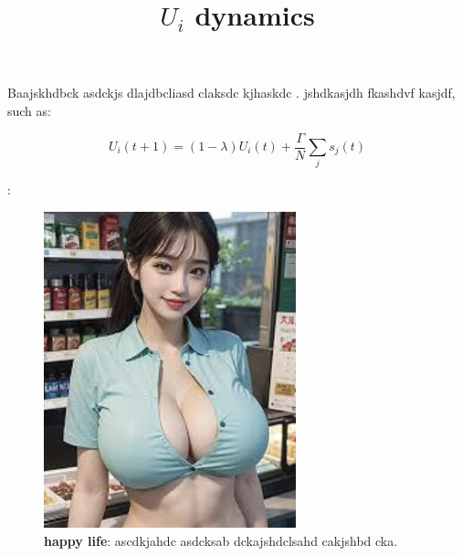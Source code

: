 \documentclass[11pt, letterpaper]{article}
\title{\textbf{$U_i$ dynamics}}
\date{}
\author{
}
\begin{document}
\maketitle

\begin{abstract}
	\lipsum[2]
\end{abstract}

Baajskhdbck asdckjs dlajdbcliasd claksdc kjhaskdc \cite{pereiro-morejonInferenceMetabolicFluxes2022}. 
jshdkasjdh fkashdvf kasjdf, such as:

\begin{equation}
  U_i(t+1) = (1-\lambda)U_i(t) + \frac{\Gamma}{N} \sum_j s_j (t)
\end{equation}

\lipsum[2]:

\begin{figure}
	\centering
	\includegraphics[scale = 0.6]{images/helloWorld.png}
	\caption{
		\textbf{happy life}:
        ascdkjahdc asdcksab dckajshdclsahd cakjshbd cka. 
	}
	\label{fig:label}
\end{figure}



	
\end{document}
